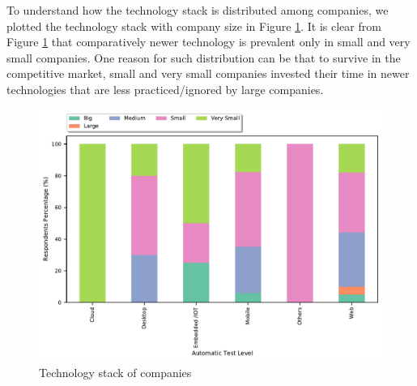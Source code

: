 To understand how the technology stack is distributed among companies, we plotted the technology stack with company size in Figure \ref{fig:technology and company size}. It is clear from Figure \ref{fig:technology and company size} that comparatively newer technology is prevalent only in small and very small companies. One reason for such distribution can be that to survive in the competitive market, small and very small companies invested their time in newer technologies that are less practiced/ignored by large companies.

\begin{figure}[h]
\centering
  \includegraphics[scale=0.45]{Figures/Technology_Company_Size}
  \caption{Technology stack of companies}
  \label{fig:technology and company size}
\end{figure}